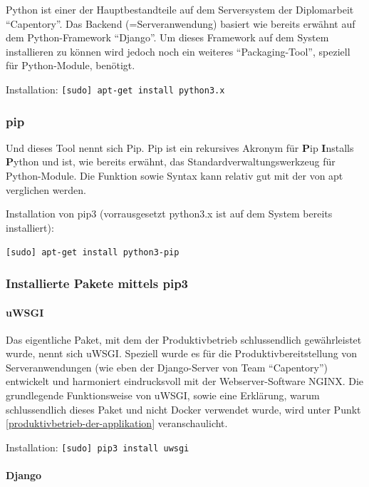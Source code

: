 Python ist einer der Hauptbestandteile auf dem Serversystem der
Diplomarbeit ``Capentory''. Das Backend (=Serveranwendung) basiert wie
bereits erwähnt auf dem Python-Framework ``Django''. Um dieses Framework
auf dem System installieren zu können wird jedoch noch ein weiteres
``Packaging-Tool'', speziell für Python-Module, benötigt.

Installation: \texttt{{[}sudo{]}\ apt-get\ install\ python3.x}

\hypertarget{pip}{%
\subsubsection{pip}\label{pip}}

Und dieses Tool nennt sich Pip. Pip ist ein rekursives Akronym für
\textbf{P}ip \textbf{I}nstalls \textbf{P}ython und ist, wie bereits
erwähnt, das Standardverwaltungswerkzeug für Python-Module. Die Funktion
sowie Syntax kann relativ gut mit der von apt verglichen werden.

Installation von pip3 (vorrausgesetzt python3.x ist auf dem System
bereits installiert):

\texttt{{[}sudo{]}\ apt-get\ install\ python3-pip}

\hypertarget{installierte-pakete-mittels-pip3}{%
\subsubsection{Installierte Pakete mittels
pip3}\label{installierte-pakete-mittels-pip3}}

\hypertarget{uwsgi}{%
\paragraph{uWSGI}\label{uwsgi}}

Das eigentliche Paket, mit dem der Produktivbetrieb schlussendlich
gewährleistet wurde, nennt sich uWSGI. Speziell wurde es für die
Produktivbereitstellung von Serveranwendungen (wie eben der
Django-Server von Team ``Capentory'') entwickelt und harmoniert
eindrucksvoll mit der Webserver-Software NGINX. Die grundlegende
Funktionsweise von uWSGI, sowie eine Erklärung, warum schlussendlich
dieses Paket und nicht Docker verwendet wurde, wird unter Punkt
\ref{produktivbetrieb-der-applikation} veranschaulicht.

Installation: \texttt{{[}sudo{]}\ pip3\ install\ uwsgi}

\hypertarget{django}{%
\paragraph{Django}\label{django}}

